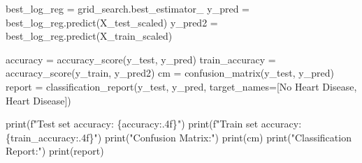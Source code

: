 \documentclass[
  11pt,
  letterpaper,
  DIV=11,
  numbers=noendperiod]{scrartcl}
\newenvironment{Shaded}{\begin{snugshade}}{\end{snugshade}}
\newcommand{\BuiltInTok}[1]{\textcolor[rgb]{0.00,0.23,0.31}{#1}}
\newcommand{\NormalTok}[1]{\textcolor[rgb]{0.00,0.23,0.31}{#1}}
\newcommand{\OperatorTok}[1]{\textcolor[rgb]{0.37,0.37,0.37}{#1}}
\newcommand{\SpecialCharTok}[1]{\textcolor[rgb]{0.37,0.37,0.37}{#1}}
\newcommand{\SpecialStringTok}[1]{\textcolor[rgb]{0.13,0.47,0.30}{#1}}
\newcommand{\StringTok}[1]{\textcolor[rgb]{0.13,0.47,0.30}{#1}}
\begin{document}
\begin{Shaded}
\begin{Highlighting}[]
\NormalTok{best\_log\_reg }\OperatorTok{=}\NormalTok{ grid\_search.best\_estimator\_}
\NormalTok{y\_pred }\OperatorTok{=}\NormalTok{ best\_log\_reg.predict(X\_test\_scaled)}
\NormalTok{y\_pred2 }\OperatorTok{=}\NormalTok{ best\_log\_reg.predict(X\_train\_scaled)}

\NormalTok{accuracy }\OperatorTok{=}\NormalTok{ accuracy\_score(y\_test, y\_pred)}
\NormalTok{train\_accuracy }\OperatorTok{=}\NormalTok{ accuracy\_score(y\_train, y\_pred2)}
\NormalTok{cm }\OperatorTok{=}\NormalTok{ confusion\_matrix(y\_test, y\_pred)}
\NormalTok{report }\OperatorTok{=}\NormalTok{ classification\_report(y\_test, y\_pred, target\_names}\OperatorTok{=}\NormalTok{[}\StringTok{\textquotesingle{}No Heart Disease\textquotesingle{}}\NormalTok{, }\StringTok{\textquotesingle{}Heart Disease\textquotesingle{}}\NormalTok{])}

\BuiltInTok{print}\NormalTok{(}\SpecialStringTok{f"Test set accuracy: }\SpecialCharTok{\{}\NormalTok{accuracy}\SpecialCharTok{:.4f\}}\SpecialStringTok{"}\NormalTok{)}
\BuiltInTok{print}\NormalTok{(}\SpecialStringTok{f"Train set accuracy: }\SpecialCharTok{\{}\NormalTok{train\_accuracy}\SpecialCharTok{:.4f\}}\SpecialStringTok{"}\NormalTok{)}
\BuiltInTok{print}\NormalTok{(}\StringTok{"Confusion Matrix:"}\NormalTok{)}
\BuiltInTok{print}\NormalTok{(cm)}
\BuiltInTok{print}\NormalTok{(}\StringTok{"Classification Report:"}\NormalTok{)}
\BuiltInTok{print}\NormalTok{(report)}
\end{Highlighting}
\end{Shaded}
\end{document}
